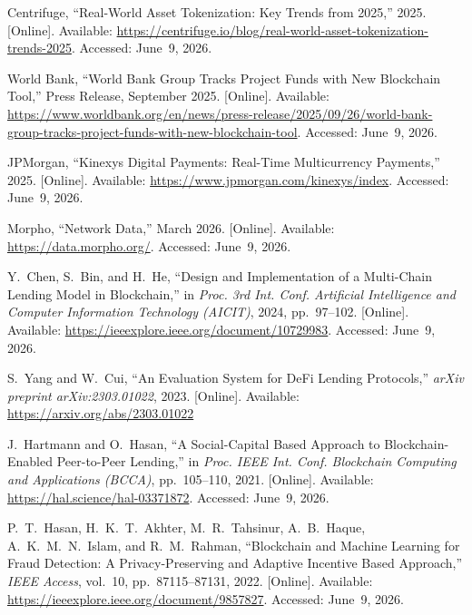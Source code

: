 \documentclass[12pt, a4paper]{report}
\begin{document}
{\begin{enumerate}[label={[\arabic*]}]
\item Centrifuge, ``Real-World Asset Tokenization: Key Trends from 2025,'' 2025. [Online]. Available: \url{https://centrifuge.io/blog/real-world-asset-tokenization-trends-2025}. Accessed: June~9, 2026.

\item World Bank, ``World Bank Group Tracks Project Funds with New Blockchain Tool,'' Press Release, September 2025. [Online]. Available: \url{https://www.worldbank.org/en/news/press-release/2025/09/26/world-bank-group-tracks-project-funds-with-new-blockchain-tool}. Accessed: June~9, 2026.

\item JPMorgan, ``Kinexys Digital Payments: Real-Time Multicurrency Payments,'' 2025. [Online]. Available: \url{https://www.jpmorgan.com/kinexys/index}. Accessed: June~9, 2026.

\item Morpho, ``Network Data,'' March 2026. [Online]. Available: \url{https://data.morpho.org/}. Accessed: June~9, 2026.

\item Y.~Chen, S.~Bin, and H.~He, ``Design and Implementation of a Multi-Chain Lending Model in Blockchain,'' in \textit{Proc. 3rd Int. Conf. Artificial Intelligence and Computer Information Technology (AICIT)}, 2024, pp.~97--102. [Online]. Available: \url{https://ieeexplore.ieee.org/document/10729983}. Accessed: June~9, 2026.

\item S.~Yang and W.~Cui, ``An Evaluation System for DeFi Lending Protocols,'' \textit{arXiv preprint arXiv:2303.01022}, 2023. [Online]. Available: \url{https://arxiv.org/abs/2303.01022}

\item J.~Hartmann and O.~Hasan, ``A Social-Capital Based Approach to Blockchain-Enabled Peer-to-Peer Lending,'' in \textit{Proc. IEEE Int. Conf. Blockchain Computing and Applications (BCCA)}, pp.~105--110, 2021. [Online]. Available: \url{https://hal.science/hal-03371872}. Accessed: June~9, 2026.

\item P.~T.~Hasan, H.~K.~T.~Akhter, M.~R.~Tahsinur, A.~B.~Haque, A.~K.~M.~N.~Islam, and R.~M.~Rahman, ``Blockchain and Machine Learning for Fraud Detection: A Privacy-Preserving and Adaptive Incentive Based Approach,'' \textit{IEEE Access}, vol.~10, pp.~87115--87131, 2022. [Online]. Available: \url{https://ieeexplore.ieee.org/document/9857827}. Accessed: June~9, 2026.


\end{enumerate}}
\end{document}
